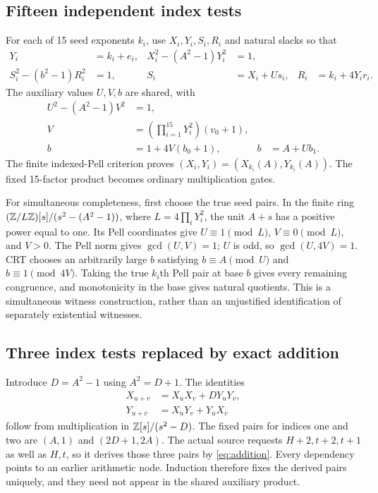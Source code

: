 \documentclass[10pt,letterpaper]{article}
\theoremstyle{definition}\newtheorem{definition}[theorem]{Definition}
\theoremstyle{remark}\newtheorem{remark}[theorem]{Remark}
\begin{document}
\subsection{Fifteen independent index tests}

For each of 15 seed exponents $k_i$, use $X_i,Y_i,S_i,R_i$ and natural
slacks so that
\begin{align*}
 Y_i&=k_i+e_i,&X_i^2-(A^2-1)Y_i^2&=1,\\
 S_i^2-(b^2-1)R_i^2&=1,&S_i&=X_i+Us_i,&R_i&=k_i+4Y_ir_i.
\end{align*}
The auxiliary values $U,V,b$ are shared, with
\begin{align*}
 U^2-(A^2-1)V^2&=1,\\
 V&=\left(\prod_{i=1}^{15}Y_i^2\right)(v_0+1),\\
 b&=1+4V(b_0+1),&b&=A+Ub_1.
\end{align*}
The finite indexed-Pell criterion proves
$(X_i,Y_i)=(X_{k_i}(A),Y_{k_i}(A))$.
The fixed 15-factor product becomes ordinary multiplication gates.

For simultaneous completeness, first choose the true seed pairs. In the
finite ring $(\mathbb Z/L\mathbb Z)[s]/(s^2-(A^2-1))$, where
$L=4\prod_iY_i^2$, the unit $A+s$ has a positive power equal to one.
Its Pell coordinates give $U\equiv1\pmod L$, $V\equiv0\pmod L$,
and $V>0$. The Pell norm gives $\gcd(U,V)=1$; $U$ is odd, so
$\gcd(U,4V)=1$. CRT chooses an arbitrarily large $b$ satisfying
$b\equiv A\pmod U$ and $b\equiv1\pmod{4V}$.
Taking the true $k_i$th Pell pair at base $b$ gives every remaining
congruence, and monotonicity in the base gives natural quotients.
This is a simultaneous witness construction, rather than an unjustified
identification of separately existential witnesses.

\subsection{Three index tests replaced by exact addition}

Introduce $D=A^2-1$ using $A^2=D+1$. The identities
\begin{align}
 X_{u+v}&=X_uX_v+DY_uY_v,\label{eq:addition}\\
 Y_{u+v}&=X_uY_v+Y_uX_v\nonumber
\end{align}
follow from multiplication in $\mathbb Z[s]/(s^2-D)$. The fixed pairs for
indices one and two are $(A,1)$ and $(2D+1,2A)$.
The actual source requests $H+2,t+2,t+1$ as well as $H,t$, so it
derives those three pairs by \eqref{eq:addition}. Every dependency points
to an earlier arithmetic node. Induction therefore fixes the derived
pairs uniquely, and they need not appear in the shared auxiliary product.
\end{document}
